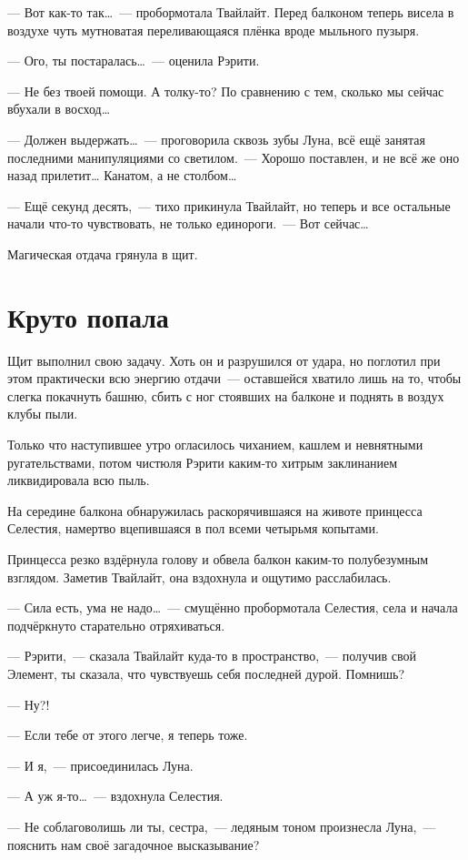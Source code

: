 \documentclass[twoside,a5paper,12pt]{extbook}
\begin{document}
— Вот как-то так… — пробормотала Твайлайт. Перед балконом теперь висела в воздухе чуть мутноватая переливающаяся плёнка вроде мыльного пузыря.

— Ого, ты постаралась… — оценила Рэрити.

— Не без твоей помощи. А толку-то? По сравнению с тем, сколько мы сейчас вбухали в восход…

— Должен выдержать… — проговорила сквозь зубы Луна, всё ещё занятая последними манипуляциями со светилом. — Хорошо поставлен, и не всё же оно назад прилетит… Канатом, а не столбом…

— Ещё секунд десять, — тихо прикинула Твайлайт, но теперь и все остальные начали что-то чувствовать, не только единороги. — Вот сейчас…

Магическая отдача грянула в щит.


\chapter{Круто попала}

Щит выполнил свою задачу. Хоть он и разрушился от удара, но поглотил при этом практически всю энергию отдачи — оставшейся хватило лишь на то, чтобы слегка покачнуть башню, сбить с ног стоявших на балконе и поднять в воздух клубы пыли.

Только что наступившее утро огласилось чиханием, кашлем и невнятными ругательствами, потом чистюля Рэрити каким-то хитрым заклинанием ликвидировала всю пыль.

На середине балкона обнаружилась раскорячившаяся на животе принцесса Селестия, намертво вцепившаяся в пол всеми четырьмя копытами.

Принцесса резко вздёрнула голову и обвела балкон каким-то полубезумным взглядом. Заметив Твайлайт, она вздохнула и ощутимо расслабилась.

— Сила есть, ума не надо… — смущённо пробормотала Селестия, села и начала подчёркнуто старательно отряхиваться.

— Рэрити, — сказала Твайлайт куда-то в пространство, — получив свой Элемент, ты сказала, что чувствуешь себя последней дурой. Помнишь?

— Ну?!

— Если тебе от этого легче, я теперь тоже.

— И я, — присоединилась Луна.

— А уж я-то… — вздохнула Селестия.

— Не соблаговолишь ли ты, сестра, — ледяным тоном произнесла Луна, — пояснить нам своё загадочное высказывание?
\end{document}
